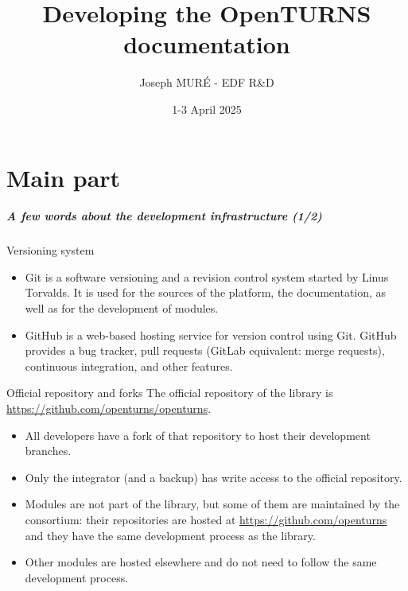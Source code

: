 \documentclass[8pt]{beamer}
\title{Developing the OpenTURNS documentation}
\author{Joseph MUR\'E - EDF R\&D}
\date{1-3 April 2025}
\institute{\small OpenTURNS Consortium}
\begin{document}
\frame{\titlepage}

\part{Main part}


\begin{frame}
  \frametitle{A few words about the development infrastructure (1/2)}
  \begin{block}{Versioning system}
    \begin{itemize}
    \item \alert{Git} is a software versioning and a revision control system started by Linus Torvalds. It is used for the sources of the platform, the documentation, as well as for the development of modules.
    \item \alert{GitHub} is a web-based hosting service for version control using Git.
    GitHub provides a bug tracker, pull requests (GitLab equivalent: merge requests), continuous integration, and other features.
    \end{itemize}
  \end{block}
  \begin{block}{Official repository and forks}
    The \alert{official repository} of the library is \url{https://github.com/openturns/openturns}.
    \begin{itemize}
    \item All developers have a \alert{fork} of that repository to host their development branches.
    \item Only the \alert{integrator} (and a backup) has write access to the official repository.
    \item Modules are not part of the library, but some of them are maintained by the consortium: their repositories are hosted at \url{https://github.com/openturns}
    and they have the same development process as the library.
    \item Other modules are hosted elsewhere and do not need to follow the same development process.
    \end{itemize}
  \end{block}
\end{frame}
\end{document}
